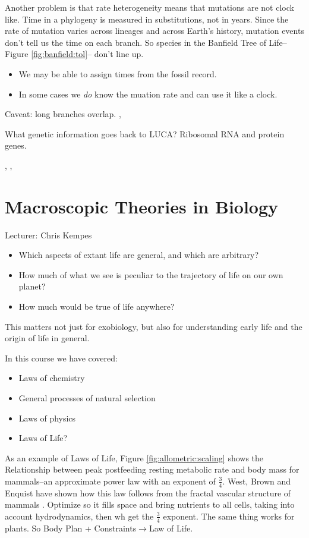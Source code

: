 \documentclass[]{article}
\begin{document}
Another problem is that rate heterogeneity means that mutations are not clock like. Time in a phylogeny is measured in substitutions, not in years. Since the rate of mutation varies across lineages and across Earth's history, mutation events don't tell us the time on each branch. So species in the Banfield Tree of Life--Figure \ref{fig:banfield:tol}-- don't line up.
\begin{itemize}
	\item We may be able to assign times from the fossil record.
	\item In some cases we \textit{do} know the muation rate and can use it like a clock.
\end{itemize}

Caveat: long branches overlap. \cite{philippe2005heterotachy},

 What genetic information goes back to LUCA? Ribosomal RNA and protein genes.
 
   \cite{quast2012silva}, \cite{sanderson2003r8s}, \cite{smit2007evolutionary}

\section{Macroscopic Theories in Biology}

Lecturer: Chris Kempes

\begin{itemize}
	\item Which aspects of extant life are general, and which are arbitrary?
	\item How much of what we see is peculiar to the trajectory of life on our own planet?
	\item How much would be true of life anywhere?
\end{itemize}

This matters not just for exobiology, but also for understanding early life and the origin of life in general.

In this course we have covered:
\begin{itemize}
	\item Laws of chemistry
	\item General processes of natural selection
	\item Laws of physics
	\item Laws of Life?
\end{itemize}

As an example of Laws of Life, Figure \ref{fig:allometric:scaling} shows the Relationship between peak postfeeding resting metabolic rate and body mass for mammals\cite{white2005allometric}--an approximate power law with an exponent of $\frac{3}{4}$. West, Brown and Enquist have shown how this law follows from the fractal vascular structure of mammals \cite{west1997general}. Optimize so it fills space and bring nutrients to all cells, taking into account hydrodynamics, then wh get the $\frac{3}{4}$ exponent. The same thing works for plants. So Body Plan + Constraints$\rightarrow$Law of Life.
\end{document}
